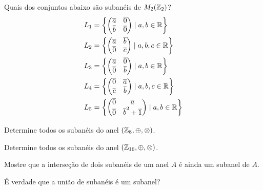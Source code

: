 \documentclass[12pt]{exam}
\begin{document}
\questao{} Quais dos conjuntos abaixo s\~ao suban\'eis de $M_2(\mathbb{Z}_2)$?
\begin{align*}
	L_1 &= \left\{\begin{pmatrix}
		\overline{a} & \overline{0}\\
		\overline{b} & \overline{0}
	\end{pmatrix} \mid a, b \in \mathbb{R}\right\}\\
	L_2 &= \left\{\begin{pmatrix}
		\overline{a} & \overline{b}\\
		\overline{0} & \overline{c}
	\end{pmatrix} \mid a, b, c \in \mathbb{R}\right\}\\
	L_3 &= \left\{\begin{pmatrix}
		\overline{a} & \overline{0}\\
		\overline{0} & \overline{b}
	\end{pmatrix} \mid a, b \in \mathbb{R}\right\}\\
	L_4 &= \left\{\begin{pmatrix}
		\overline{0} & \overline{a}\\
		\overline{c} & \overline{b}
	\end{pmatrix} \mid a, b, c \in \mathbb{R}\right\}\\
	L_5 &= \left\{\begin{pmatrix}
		\overline{0} & \overline{a}\\
		\overline{0} & \overline{b}^2 + \overline{1}
	\end{pmatrix} \mid a, b \in \mathbb{R}\right\}
\end{align*}

\vspace{.3cm}

\questao{} Determine todos os suban\'eis do anel $(\mathbb{Z}_8, \oplus, \otimes)$.

\vspace{.3cm}

\questao{} Determine todos os suban\'eis do anel $(\mathbb{Z}_{16}, \oplus, \otimes)$.

\vspace{.3cm}

\questao{} Mostre que a interse\c{c}\~ao de dois suban\'eis de um anel $A$ \'e ainda um subanel de $A$.

\vspace{.3cm}

\questao{} \'E verdade que a uni\~ao de suban\'eis \'e um subanel?

\vspace{.3cm}
\end{document}
